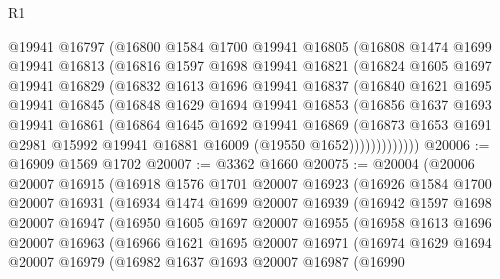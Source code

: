 \begin{lexlean}{R1}
\begin{coremodule}
        @19941
        @16797
        (@16800
          @1584
          @1700
          @19941
          @16805
          (@16808
            @1474
            @1699
            @19941
            @16813
            (@16816
              @1597
              @1698
              @19941
              @16821
              (@16824
                @1605
                @1697
                @19941
                @16829
                (@16832
                  @1613
                  @1696
                  @19941
                  @16837
                  (@16840
                    @1621
                    @1695
                    @19941
                    @16845
                    (@16848
                      @1629
                      @1694
                      @19941
                      @16853
                      (@16856
                        @1637
                        @1693
                        @19941
                        @16861
                        (@16864
                          @1645
                          @1692
                          @19941
                          @16869
                          (@16873
                            @1653
                            @1691
                            @2981
                            @15992
                            @19941
                            @16881
                            @16009
                            (@19550 @1652)))))))))))))
@20006 := @16909 @1569 @1702
@20007 := @3362 @1660
@20075 := @20004
    (@20006
      @20007
      @16915
      (@16918
        @1576
        @1701
        @20007
        @16923
        (@16926
          @1584
          @1700
          @20007
          @16931
          (@16934
            @1474
            @1699
            @20007
            @16939
            (@16942
              @1597
              @1698
              @20007
              @16947
              (@16950
                @1605
                @1697
                @20007
                @16955
                (@16958
                  @1613
                  @1696
                  @20007
                  @16963
                  (@16966
                    @1621
                    @1695
                    @20007
                    @16971
                    (@16974
                      @1629
                      @1694
                      @20007
                      @16979
                      (@16982
                        @1637
                        @1693
                        @20007
                        @16987
                        (@16990

\end{coremodule}
\end{lexlean}
